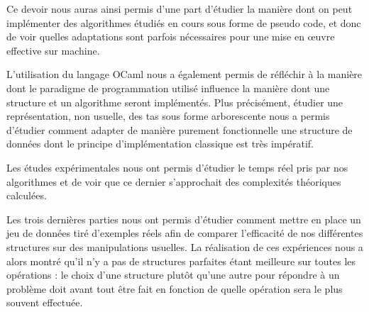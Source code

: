 \documentclass[12pt,a4paper]{article}
\begin{document}
Ce devoir nous auras ainsi permis d'une part d'étudier la manière dont on peut implémenter des algorithmes étudiés en cours sous forme de pseudo code, et donc de voir quelles adaptations sont parfois nécessaires pour une mise en œuvre effective sur machine.

L'utilisation du langage OCaml nous a également permis de réfléchir à la manière dont le paradigme de programmation utilisé influence la manière dont une structure et un algorithme seront implémentés.  Plus précisément, étudier une représentation, non usuelle, des tas sous forme arborescente nous a permis d'étudier comment adapter de manière purement fonctionnelle une structure de données dont le principe d'implémentation classique est très impératif.

Les études expérimentales nous ont permis d'étudier le temps réel pris par nos algorithmes et de voir que ce dernier s'approchait des complexités théoriques calculées.

Les trois dernières parties nous ont permis d'étudier comment mettre en place un jeu de données tiré d'exemples réels afin de comparer l'efficacité de nos différentes structures sur des manipulations usuelles. La réalisation de ces expériences nous a alors montré qu'il n'y a pas de structures parfaites étant meilleure sur toutes les opérations : le choix d'une structure plutôt qu'une autre pour répondre à un problème doit avant tout être fait en fonction de quelle opération sera le plus souvent effectuée. 


\cleardoublepage



\end{document}
